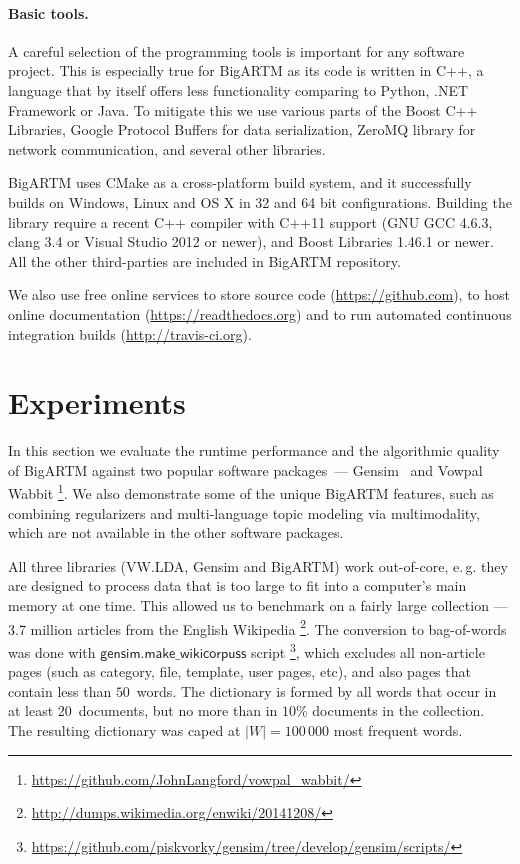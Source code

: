 \documentclass[russian]{llncs}
\newcommand{\kw}[1]{\textsf{#1}}
\begin{document}
\paragraph{Basic tools.}
A careful selection of the programming tools is important for any software project.
This is especially true for BigARTM as its code is written in C++,
a language that by itself offers less functionality comparing to Python, .NET Framework or Java.
To mitigate this we use
various parts of the Boost C++ Libraries,
Google Protocol Buffers for data serialization,
ZeroMQ library for network communication,
and several other libraries.

BigARTM uses CMake as a cross-platform build system,
and it successfully builds on Windows, Linux and OS X in 32 and 64 bit configurations.
Building the library require a recent C++ compiler with C++11 support (GNU GCC 4.6.3, clang 3.4 or Visual Studio 2012 or newer),
and Boost Libraries 1.46.1 or newer. All the other third-parties are included in BigARTM repository.

We also use free online services
to store source code (\url{https://github.com}),
to host online documentation (\url{https://readthedocs.org}) and
to run automated continuous integration builds (\url{http://travis-ci.org}).

\section{Experiments}
\label{sec:Experiments}

In this section we evaluate the runtime performance and the algorithmic quality of \mbox{BigARTM}
against two popular software packages~---
Gensim~\cite{rehurek_lrec}
and Vowpal Wabbit%
\footnote{\url{https://github.com/JohnLangford/vowpal_wabbit/}}.
We also demonstrate some of the unique BigARTM features, such as
combining regularizers and multi-language topic modeling via multimodality,
which are not available in the other software packages.

All three libraries (VW.LDA, Gensim and BigARTM) work out-of-core,
e.\,g. they are designed to process data that is too large to fit into a computer's main memory at one time.
This allowed us to benchmark on a fairly large collection --- 3.7 million articles from the English Wikipedia%
\footnote{\url{http://dumps.wikimedia.org/enwiki/20141208/}}.
The conversion to bag-of-words was done with $\kw{gensim.make\_wikicorpuss}$ script%
\footnote{\url{https://github.com/piskvorky/gensim/tree/develop/gensim/scripts/}},
which excludes all non-article pages (such as category, file, template, user pages, etc),
and also pages that contain less than $50$~words.
The dictionary is formed by all words that occur in at least 20~documents,
but no more than in $10\%$ documents in the collection.
The resulting dictionary was caped at $|W| = 100\,000$ most frequent words.
\end{document}
